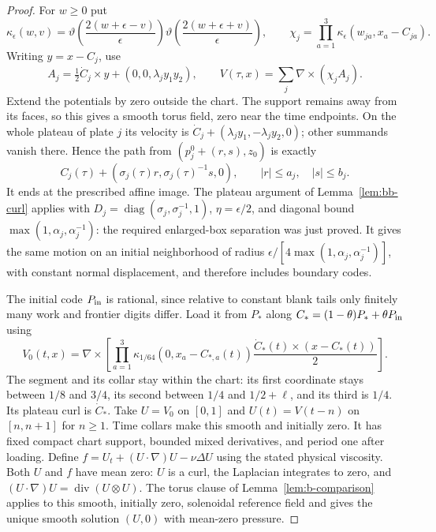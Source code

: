\begin{proof}
For $w\ge0$ put
\[
 \kappa_\epsilon(w,v)=
 \vartheta\!\left(\frac{2(w+\epsilon-v)}\epsilon\right)
 \vartheta\!\left(\frac{2(w+\epsilon+v)}\epsilon\right),\qquad
 \chi_j=\prod_{a=1}^3\kappa_\epsilon(w_{ja},x_a-C_{ja}).
\]
Writing $y=x-C_j$, use
\[
 A_j=\tfrac12\dot C_j\times y+(0,0,\lambda_jy_1y_2),
 \qquad V(\tau,x)=\sum_j\nabla\times(\chi_jA_j).
\]
Extend the potentials by zero outside the chart.  The support remains
away from its faces, so this gives a smooth torus field, zero near the
time endpoints.  On the whole plateau of plate $j$ its velocity is
$\dot C_j+(\lambda_jy_1,-\lambda_jy_2,0)$; other summands vanish
there.  Hence the path from $(p_j^0+(r,s),z_0)$ is exactly
\begin{equation}\label{ba:plate-path}
 C_j(\tau)+(\sigma_j(\tau)r,\sigma_j(\tau)^{-1}s,0),
 \qquad |r|\le a_j,\quad |s|\le b_j.
\end{equation}
It ends at the prescribed affine image.  The plateau argument of
Lemma~\ref{lem:bb-curl} applies with
$D_j=\operatorname{diag}(\sigma_j,\sigma_j^{-1},1)$,
$\eta=\epsilon/2$, and diagonal bound
$\max(1,\alpha_j,\alpha_j^{-1})$: the required enlarged-box separation
was just proved.  It gives the same motion on an initial neighborhood
of radius $\epsilon/[4\max(1,\alpha_j,\alpha_j^{-1})]$, with constant
normal displacement, and therefore includes boundary codes.

The initial code $P_{\rm in}$ is rational, since relative to constant
blank tails only finitely many work and frontier digits differ.  Load it
from $P_*$ along $C_*=(1-\theta)P_*+\theta P_{\rm in}$ using
\[
 V_0(t,x)=\nabla\times\left[
 \prod_{a=1}^3\kappa_{1/64}(0,x_a-C_{*,a}(t))
                \frac{\dot C_*(t)\times(x-C_*(t))}{2}\right].
\]
The segment and its collar stay within the chart: its first coordinate
stays between $1/8$ and $3/4$, its second between $1/4$ and
$1/2+\ell$, and its third is $1/4$.  Its plateau curl is $\dot C_*$.
Take $U=V_0$ on $[0,1]$ and $U(t)=V(t-n)$ on $[n,n+1]$ for $n\ge1$.
Time collars make this smooth and initially zero.  It has fixed compact
chart support, bounded mixed derivatives, and period one after loading.
Define $f=U_t+(U\cdot\nabla)U-\nu\Delta U$ using the stated physical
viscosity.  Both $U$ and $f$ have mean zero: $U$ is a curl, the
Laplacian integrates to zero, and
$(U\cdot\nabla)U=\operatorname{div}(U\otimes U)$.
The torus clause of Lemma~\ref{lem:b-comparison} applies to this
smooth, initially zero, solenoidal reference field and gives the unique
smooth solution $(U,0)$ with mean-zero pressure.


\end{proof}
